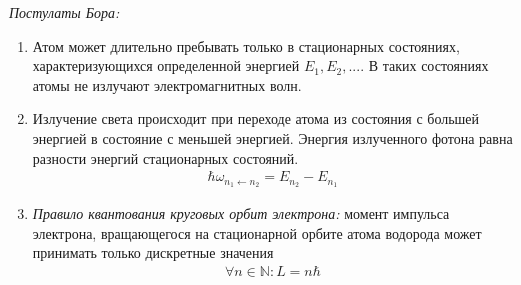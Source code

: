 \textit{Постулаты Бора:}
\begin{enumerate}
\item Атом может длительно пребывать только в стационарных состояниях, характеризующихся определенной энергией $E_1,E_2,...$. В таких состояниях атомы не излучают электромагнитных волн.
\item Излучение света происходит при переходе атома из состояния с большей энергией в состояние с меньшей энергией. Энергия излученного фотона равна разности энергий стационарных состояний.
\begin{gather*}
\hbar\omega_{n_1 \leftarrow n_2} = E_{n_2} - E_{n_1}
\end{gather*}
\item \textit{Правило квантования круговых орбит электрона:} момент импульса электрона, вращающегося на стационарной орбите атома водорода может принимать только дискретные значения
\begin{gather*}
\forall n\in\mathbb{N}\colon L = n\hbar
\end{gather*}
\end{enumerate}

